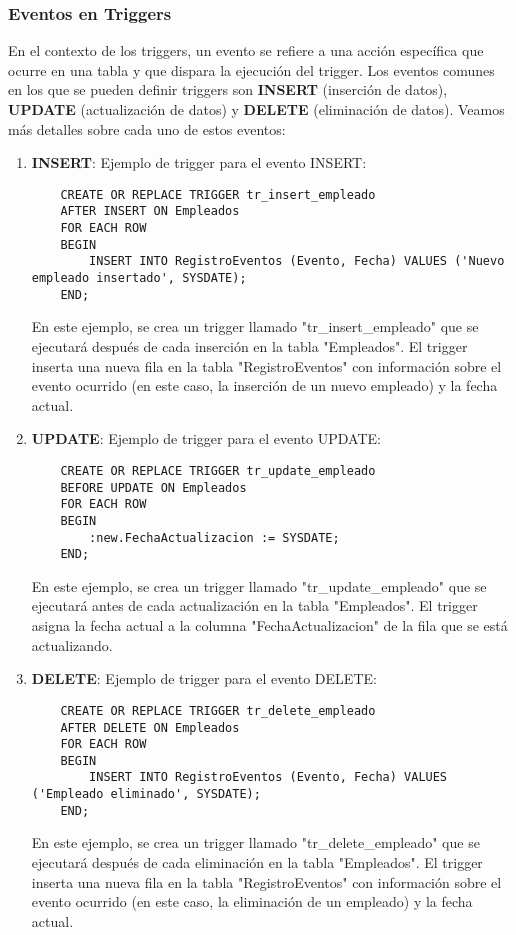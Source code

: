 \documentclass[executivepaper]{article}
\begin{document}
\subsubsection*{Eventos en Triggers}

En el contexto de los triggers, un evento se refiere a una acción específica que ocurre en una tabla y que dispara la ejecución del trigger. Los eventos comunes en los que se pueden definir triggers son \textbf{INSERT} (inserción de datos), \textbf{UPDATE} (actualización de datos) y \textbf{DELETE} (eliminación de datos). Veamos más detalles sobre cada uno de estos eventos:

\begin{enumerate}
    \item \textbf{INSERT}: Ejemplo de trigger para el evento INSERT:
    
    \begin{lstlisting}
    CREATE OR REPLACE TRIGGER tr_insert_empleado
    AFTER INSERT ON Empleados
    FOR EACH ROW
    BEGIN
        INSERT INTO RegistroEventos (Evento, Fecha) VALUES ('Nuevo empleado insertado', SYSDATE);
    END;
    \end{lstlisting}
    
    En este ejemplo, se crea un trigger llamado "tr\_insert\_empleado" que se ejecutará después de cada inserción en la tabla "Empleados". El trigger inserta una nueva fila en la tabla "RegistroEventos" con información sobre el evento ocurrido (en este caso, la inserción de un nuevo empleado) y la fecha actual.
    
    \item \textbf{UPDATE}: Ejemplo de trigger para el evento UPDATE:
    
    \begin{lstlisting}
    CREATE OR REPLACE TRIGGER tr_update_empleado
    BEFORE UPDATE ON Empleados
    FOR EACH ROW
    BEGIN
        :new.FechaActualizacion := SYSDATE;
    END;
    \end{lstlisting}
    
    En este ejemplo, se crea un trigger llamado "tr\_update\_empleado" que se ejecutará antes de cada actualización en la tabla "Empleados". El trigger asigna la fecha actual a la columna "FechaActualizacion" de la fila que se está actualizando.
    
    \item \textbf{DELETE}: Ejemplo de trigger para el evento DELETE:
    
    \begin{lstlisting}
    CREATE OR REPLACE TRIGGER tr_delete_empleado
    AFTER DELETE ON Empleados
    FOR EACH ROW
    BEGIN
        INSERT INTO RegistroEventos (Evento, Fecha) VALUES ('Empleado eliminado', SYSDATE);
    END;
    \end{lstlisting}
    
    En este ejemplo, se crea un trigger llamado "tr\_delete\_empleado" que se ejecutará después de cada eliminación en la tabla "Empleados". El trigger inserta una nueva fila en la tabla "RegistroEventos" con información sobre el evento ocurrido (en este caso, la eliminación de un empleado) y la fecha actual.
\end{enumerate}
\end{document}
